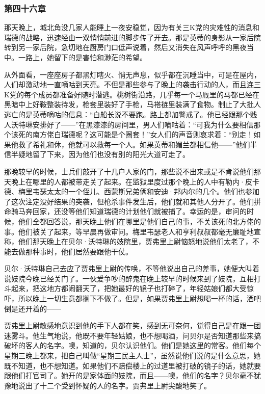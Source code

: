 \subsubsection{第四十六章}

\par 那天晚上，城北角没几家人能睡上一夜安稳觉，因为有关三K党的灾难性的消息和瑞德的战略，迅速经由一双悄悄前进的脚步传了开去。那是英蒂的身影从一家后院转到另一家后院，急切地在厨房门口低声说着，然后又消失在风声呼呼的黑夜当中。一路上，她留下的是害怕和渺茫的希望。
\par 从外面看，一座座房子都黑灯瞎火、悄无声息，似乎都在沉睡当中，可是在屋内，人们却激动地一直嘀咕到天亮。不但是那些参与了晚上的袭击行动的人，而且连三K党的每个成员都准备好随时潜逃。桃树街沿路，几乎每一个马厩里的马都已经在黑暗中上好鞍整装待发，枪套里装好了手枪，马褡裢里装满了食物。制止了大批人逃亡的是英蒂嘀咕的信息：“白船长说不要跑。路上都加警戒了。他已经跟那个贱人沃特琳安排好了——”在黑漆漆的房间里，男人们嘀咕着：“可我为什么要相信那个该死的南方佬白瑞德呢？这可能是个圈套！”女人们的声音则哀求着：“别走！如果他救了希礼和休，他就可以救每一个人。如果英蒂和媚兰都相信他——”他们半信半疑地留了下来，因为他们也没有别的阳光大道可走了。
\par 那晚较早的时候，士兵们敲开了十几户人家的门，那些说不出来或是不肯说他们那天晚上在哪里的人都被带走关了起来。在监狱里度过那个晚上的人中有勒内·皮卡德、梅里韦瑟太太的一个侄儿、西蒙斯兄弟俩和安迪·邦内尔的几个。他们也参加了这次注定没好结果的突袭，但枪杀事件发生后，他们就和其他人分开了。他们拼命骑马奔回家，还没等他们知道瑞德的计划他们就被捕了。幸运的是，审问的时候，他们全都回答说，那天晚上他们在哪里是他们自己的事，不关该死的北方佬的事。他们被关了起来，等早晨再做审问。梅里韦瑟老人和亨利叔叔都毫无廉耻地宣称，他们那天晚上在贝尔·沃特琳的妓院里，贾弗里上尉恼怒地说他们太老了，不能去做那种事时，他们居然要跟他干仗。
\par 贝尔·沃特琳自己去应了贾弗里上尉的传唤，不等他说出自己的差事，她便大叫着说妓院今晚已经关门了。一伙爱争吵的醉鬼在晚上较早的时候来到了妓院，互相打斗起来，把这地方都闹翻天了，把她最好的镜子也打碎了，年轻姑娘们都大受惊吓，所以晚上一切生意都搁下不做了。但是，如果贾弗里上尉想喝一杯的话，酒吧倒是还开着的——
\par 贾弗里上尉敏感地意识到他的手下人都在笑，感到无可奈何，觉得自己是在跟一团迷雾斗。他生气地说，他既不要年轻姑娘，也不想喝酒，问贝尔是否知道那些来搞破坏的客人的名字。噢，知道的，贝尔认识他们。他们是她这里的常客。他们每个星期三晚上都来，把自己叫做“星期三民主人士”，虽然说他们说的是什么意思，她既不知道，也不想知道。如果他们不赔偿楼上的过道里被打破的镜子的话，她就要跟他们打官司了。她开的是家体面的妓院，而且——噢，他们的名字？贝尔毫不犹豫地说出了十二个受到怀疑的人的名字。贾弗里上尉尖酸地笑了。
